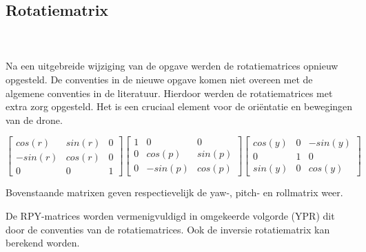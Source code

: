 \subsection{Rotatiematrix}
\\\\
Na een uitgebreide wijziging van de opgave werden de rotatiematrices opnieuw opgesteld. De conventies in de nieuwe opgave komen niet overeen met de algemene conventies in de literatuur. Hierdoor werden de rotatiematrices met extra zorg opgesteld. Het is een cruciaal element voor de ori\"entatie en bewegingen van de drone.
\begin{table}[h]
	\centering
		\(
		\begin{bmatrix} 
		cos(r) & sin(r) & 0 \\ 
		-sin(r) & cos(r) & 0 \\
		0 & 0 & 1
		\end{bmatrix}
		\begin{bmatrix} 
		1 & 0 & 0 \\ 
		0 & cos(p) & sin(p) \\
		0 & -sin(p) & cos(p)
		\end{bmatrix}
		\begin{bmatrix} 
			cos(y) & 0 & -sin(y) \\ 
			0 & 1 & 0 \\
			sin(y) & 0 & cos(y)
		\end{bmatrix}
		\)
	\caption{Bovenstaande matrixen geven respectievelijk de yaw-, pitch- en rollmatrix weer.}
\end{table}
\noindent
De RPY-matrices worden vermenigvuldigd in omgekeerde volgorde (YPR) dit door de conventies van de rotatiematrices. Ook de inversie rotatiematrix kan berekend worden.